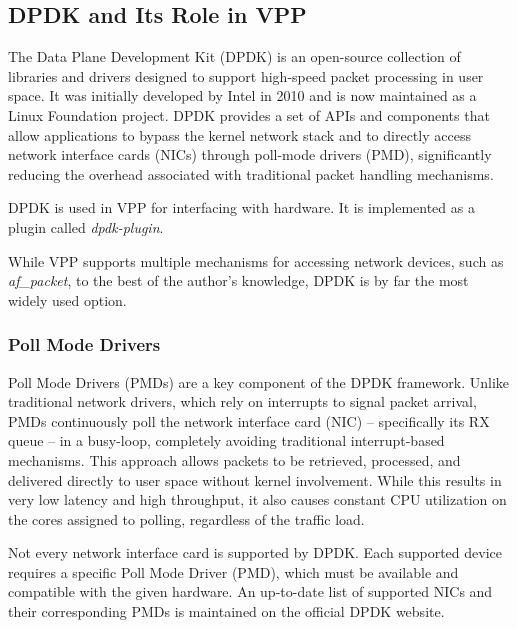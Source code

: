 \subsection{DPDK and Its Role in VPP}
The Data Plane Development Kit (DPDK) is an open-source collection of libraries and drivers designed to support high-speed packet processing in user space. 
It was initially developed by Intel in 2010 and is now maintained as a Linux Foundation project. 
DPDK provides a set of APIs and components that allow applications to bypass the kernel network stack and to directly access network interface cards (NICs) 
through poll-mode drivers (PMD), significantly reducing the overhead associated with traditional packet handling mechanisms.~\cite{dpdk_about}

DPDK is used in VPP for interfacing with hardware. It is implemented as a plugin called \textit{dpdk-plugin}.~\cite{LINGUAGLOSSA, DR:COMMAG-18} 

While VPP supports multiple mechanisms for accessing network devices, such as \textit{af\_packet}, to the best of the author's knowledge, DPDK is by far the most widely used option.

\subsubsection{Poll Mode Drivers}
Poll Mode Drivers (PMDs) are a key component of the DPDK framework. Unlike traditional network drivers, which rely on interrupts to signal packet arrival, 
PMDs continuously poll the network interface card (NIC) -- specifically its RX queue -- in a busy-loop, completely avoiding traditional interrupt-based mechanisms. 
This approach allows packets to be retrieved, processed, and delivered directly to user space without kernel involvement. 
While this results in very low latency and high throughput, it also causes constant CPU utilization on the cores assigned to polling, regardless of the traffic load.~\cite{FREITAS2022148}

Not every network interface card is supported by DPDK. Each supported device requires a specific Poll Mode Driver (PMD), which must be available and compatible with the given hardware. 
An up-to-date list of supported NICs and their corresponding PMDs is maintained on the official DPDK website.~\cite{dpdk-supported-nics}

